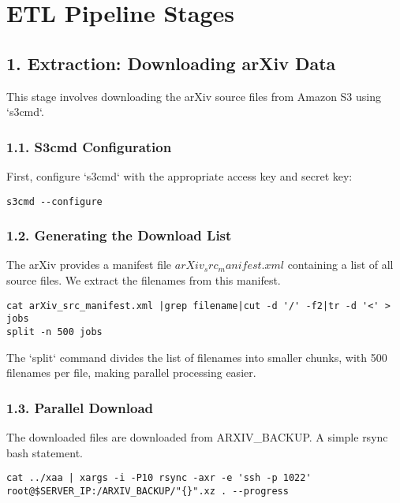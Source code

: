 \documentclass{article}
\begin{document}
\section{ETL Pipeline Stages}

\subsection{1. Extraction: Downloading arXiv Data}

This stage involves downloading the arXiv source files from Amazon S3 using `s3cmd`.

\subsubsection{1.1. S3cmd Configuration}

First, configure `s3cmd` with the appropriate access key and secret key:

\begin{lstlisting}
s3cmd --configure
\end{lstlisting}

\subsubsection{1.2. Generating the Download List}

The arXiv provides a manifest file $arXiv_src_manifest.xml$ containing a list of all source files.  We extract the filenames from this manifest.

\begin{lstlisting}
cat arXiv_src_manifest.xml |grep filename|cut -d '/' -f2|tr -d '<' > jobs
split -n 500 jobs
\end{lstlisting}

The `split` command divides the list of filenames into smaller chunks, with 500 filenames per file,  making parallel processing easier.

\subsubsection{1.3. Parallel Download}

The downloaded files are downloaded from ARXIV\_BACKUP.  A simple rsync bash statement.

\begin{lstlisting}
cat ../xaa | xargs -i -P10 rsync -axr -e 'ssh -p 1022' root@$SERVER_IP:/ARXIV_BACKUP/"{}".xz . --progress
\end{lstlisting}
\end{document}
